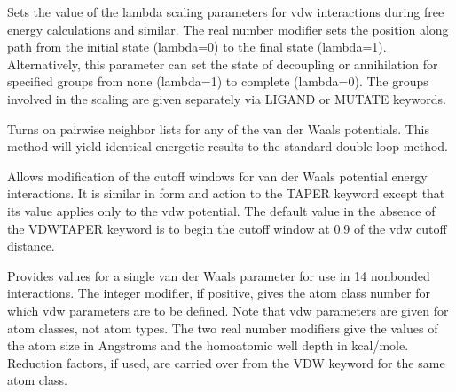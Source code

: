 \documentclass[letterpaper,11pt,english]{sphinxmanual}
\begin{document}
\ignorespaces {}\label{\detokenize{text/keywords:key-vdw-lambda}}\begin{description}
\sphinxAtStartPar
Sets the value of the lambda scaling parameters for vdw interactions during free energy calculations and similar. The real number modifier sets the position along path from the initial state (lambda=0) to the final state (lambda=1). Alternatively, this parameter can set the state of decoupling or annihilation for specified groups from none (lambda=1) to complete (lambda=0). The groups involved in the scaling are given separately via LIGAND or MUTATE keywords.

\end{description}

\ignorespaces {}\label{\detokenize{text/keywords:key-vdw-list}}\begin{description}
\sphinxAtStartPar
Turns on pairwise neighbor lists for any of the van der Waals potentials. This method will yield identical energetic results to the standard double loop method.

\end{description}

\ignorespaces {}\label{\detokenize{text/keywords:key-vdw-taper}}\begin{description}
\sphinxAtStartPar
Allows modification of the cutoff windows for van der Waals potential energy interactions. It is similar in form and action to the TAPER keyword except that its value applies only to the vdw potential. The default value in the absence of the VDW\sphinxhyphen{}TAPER keyword is to begin the cutoff window at 0.9 of the vdw cutoff distance.

\end{description}

\ignorespaces {}\label{\detokenize{text/keywords:key-vdw14}}\begin{description}
\sphinxAtStartPar
Provides values for a single van der Waals parameter for use in 1\sphinxhyphen{}4 nonbonded interactions. The integer modifier, if positive, gives the atom class number for which vdw parameters are to be defined. Note that vdw parameters are given for atom classes, not atom types. The two real number modifiers give the values of the atom size in Angstroms and the homoatomic well depth in kcal/mole. Reduction factors, if used, are carried over from the VDW keyword for the same atom class.

\end{description}
\end{document}
